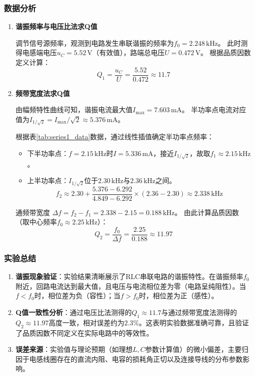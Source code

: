 \documentclass[11pt]{article}
\begin{document}
\subsubsection{数据分析}
\begin{enumerate}
    \item \textbf{谐振频率与电压比法求Q值}
    
    调节信号源频率，观测到电路发生串联谐振的频率为$f_0=2.248\,\text{kHz}$。
    此时测得电感端电压$u_C=5.52\,\text{V}$（有效值），路端总电压$U=0.472\,\text{V}$。
    根据品质因数定义计算：
    \[ Q_1 = \frac{u_C}{U} = \frac{5.52}{0.472} \approx 11.7 \]

    \item \textbf{频带宽度法求Q值}
    
    由幅频特性曲线可知，谐振电流最大值$I_{\max} = 7.603\,\text{mA}$。
    半功率点电流对应值为$I_{1/\sqrt{2}} = I_{\max}/\sqrt{2} \approx 5.376\,\text{mA}$。
    
    根据表\ref{tab:series1_data}数据，通过线性插值确定半功率点频率：
    \begin{itemize}
        \item 下半功率点：$f=2.15\,\text{kHz}$时$I=5.336\,\text{mA}$，接近$I_{1/\sqrt{2}}$，故取$f_1 \approx 2.15\,\text{kHz}$。
        \item 上半功率点：$I_{1/\sqrt{2}}$位于$2.30\,\text{kHz}$与$2.36\,\text{kHz}$之间。
        \[ f_2 \approx 2.30 + \frac{5.376 - 6.292}{4.849 - 6.292} \times (2.36 - 2.30) \approx 2.338\,\text{kHz} \]
    \end{itemize}
    
    通频带宽度 $\Delta f = f_2 - f_1 = 2.338 - 2.15 = 0.188\,\text{kHz}$。
    由此计算品质因数（取中心频率$f_0 \approx 2.25\,\text{kHz}$）：
    \[ Q_2 = \frac{f_0}{\Delta f} = \frac{2.25}{0.188} \approx 11.97 \]
\end{enumerate}

\subsubsection{实验总结}
\begin{enumerate}
    \item \textbf{谐振现象验证}：实验结果清晰展示了RLC串联电路的谐振特性。在谐振频率$f_0$附近，回路电流达到最大值，且电压与电流相位差为零（电路呈纯阻性）。当$f<f_0$时，相位差为负（容性）；当$f>f_0$时，相位差为正（感性）。
    
    \item \textbf{Q值一致性分析}：通过电压比法测得的$Q_1 \approx 11.7$与通过频带宽度法测得的$Q_2 \approx 11.97$高度一致，相对误差约为$2.3\%$。这表明实验数据准确可靠，且验证了品质因数不同定义在实际电路中的等效性。
    
    \item \textbf{误差来源}：实验值与理论预期（如理想$L,C$参数计算值）的微小偏差，主要归因于电感线圈存在的直流内阻、电容的损耗角正切以及连接导线的分布参数影响。
\end{enumerate} 
\end{document}
